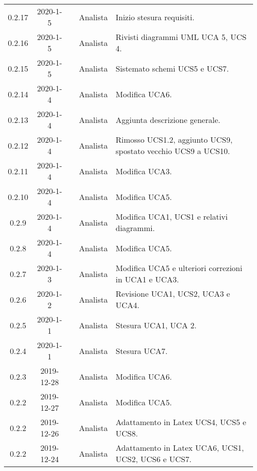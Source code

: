 {\begin{longtable}{ c c  C{4cm}  C{3cm} C{4cm}}
0.2.17 & 2020-1-5 & \CE{} & Analista & Inizio stesura requisiti. \\

0.2.16 & 2020-1-5 & \DF{} & Analista & Rivisti diagrammi UML UCA 5, UCS 4. \\

0.2.15 & 2020-1-5 & \PF{} & Analista & Sistemato schemi UCS5 e UCS7. \\

0.2.14 & 2020-1-4 & \PF{} & Analista & Modifica UCA6. \\

0.2.13 & 2020-1-4 & \CE{} & Analista & Aggiunta descrizione generale. \\

0.2.12 & 2020-1-4 & \CE{} & Analista & Rimosso UCS1.2, aggiunto UCS9, spostato vecchio UCS9 a UCS10. \\

0.2.11 & 2020-1-4 & \PF{} & Analista & Modifica UCA3. \\

0.2.10 & 2020-1-4 & \DF{} & Analista & Modifica UCA5. \\

0.2.9 & 2020-1-4 & \DF{} & Analista & Modifica UCA1, UCS1 e relativi diagrammi. \\

0.2.8 & 2020-1-4 & \CE{} & Analista & Modifica UCA5. \\

0.2.7 & 2020-1-3 & \CE{} & Analista & Modifica UCA5 e ulteriori correzioni in UCA1 e UCA3. \\

0.2.6 & 2020-1-2 & \CE{} & Analista & Revisione UCA1, UCS2, UCA3 e UCA4. \\

0.2.5 & 2020-1-1 & \BR{} & Analista & Stesura UCA1, UCA 2. \\

0.2.4 & 2020-1-1 & \PF{} & Analista & Stesura UCA7. \\

0.2.3 & 2019-12-28 & \DF{} & Analista & Modifica UCA6. \\

0.2.2 & 2019-12-27 & \PF{} & Analista & Modifica UCA5. \\

0.2.2 & 2019-12-26 & \CE{} & Analista & Adattamento in Latex UCS4, UCS5 e UCS8. \\

0.2.2 & 2019-12-24 & \DF{} & Analista & Adattamento in Latex UCA6, UCS1, UCS2, UCS6 e UCS7. \\


\end{longtable}}
